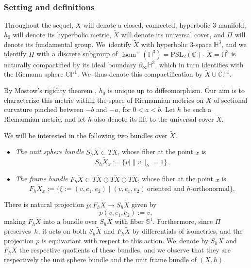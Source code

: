 \documentclass[11pt]{article}
\theoremstyle{plain}
\theoremstyle{definition}
\newcommand\PSLc{\mathrm{PSL}_2(\mathbb{C})}
\newcommand\Hyp{\mathbb{H}^3}
\newcommand\CP{\C\PP^1}
\newcommand{\C}{{\mathbb C}}
\newcommand{\PP}{{\mathbb P}}
\let\dans\subset
\newcommand{\bord}{\partial_{\infty}}
\DeclareMathOperator{\Isom}{Isom}
\begin{document}
\subsubsection{Setting and definitions}\label{ss.as_Plateau_definitions} Throughout the sequel, $X$ will denote a closed, connected, hyperbolic $3$\nobreakdash-manifold, $h_0$ will denote its hyperbolic metric, $\tilde{X}$ will denote its universal cover, and $\Pi$ will denote its fundamental group. We~identify $\tilde{X}$ with hyperbolic $3$\nobreakdash-space $\Hyp$, and we identify $\Pi$ with a discrete subgroup of $\Isom^+(\Hyp)=\PSLc$. $\tilde{X}=\Hyp$ is naturally compactified by its ideal boundary $\bord\Hyp$, which in turn identifies with the Riemann sphere $\CP$. We~thus denote this compactification by $\tilde{X}\cup\CP$.

By Mostow's rigidity theorem \cite{Mostow}, $h_0$ is unique up to diffeomorphism. Our aim is to characterize this metric within the space of Riemannian metrics on $X$ of sectional curvature pinched between $-b$ and $-a$, for $0<a<b$. Let $h$ be such a Riemannian metric, and let $h$ also denote its lift to the universal cover $\tilde{X}$.

We will be interested in the following two bundles over $\tilde{X}$.
\begin{itemize}
\item \emph{The unit sphere bundle} $S_h\tilde{X}\dans T\tilde{X}$, whose fiber at the point $x$ is
\begin{equation*}
S_h\tilde{X}_x:=\{v\mid \|v\|_h=1\}.
\end{equation*}
\item \emph{The frame bundle} $F_h\tilde{X}\dans T\tilde{X}\oplus T\tilde{X}\oplus T\tilde{X}$, whose fiber at the point $x$ is
\begin{equation*}
F_h\tilde{X}_x:=\{\xi:=(v,e_1,e_2)\mid (v,e_1,e_2)\ \text{oriented and $h$-orthonormal}\}.
\end{equation*}
\end{itemize}
There is natural projection $p:F_h\tilde{X}\to S_h\tilde{X}$ given by
\begin{equation*}
p(v,e_1,e_2):=v,
\end{equation*}
making $F_h\tilde{X}$ into a bundle over $S_h\tilde{X}$ with fiber $\mathbb{S}^1$. Furthermore, since $\Pi$ preserves~$h$, it acts on both $S_h\tilde{X}$ and $F_h\tilde{X}$ by differentials of isometries, and the projection $p$ is equivariant with respect to this action. We~denote by $S_hX$ and $F_hX$ the respective quotients of these bundles, and we observe that they are respectively the unit sphere bundle and the unit frame bundle of $(X,h)$.
\end{document}
